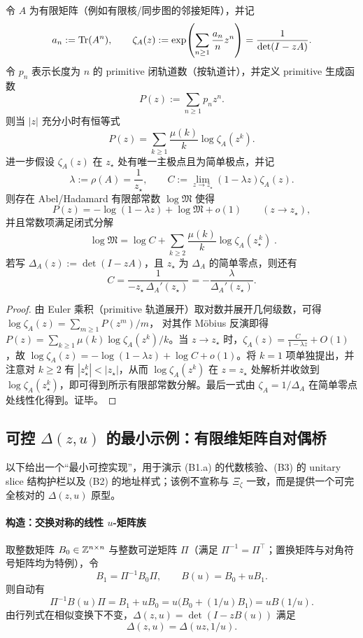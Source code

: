 \begin{theorem}\label{thm:abel-mertens-universal-bridge}
令 $A$ 为有限矩阵（例如有限核/同步图的邻接矩阵），并记
$$
a_n:=\mathrm{Tr}(A^n),\qquad
\zeta_A(z):=\exp\!\left(\sum_{n\ge 1}\frac{a_n}{n}z^n\right)=\frac{1}{\det(I-zA)}.
$$
令 $p_n$ 表示长度为 $n$ 的 primitive 闭轨道数（按轨道计），并定义 primitive 生成函数
$$
P(z):=\sum_{n\ge 1}p_n z^n.
$$
则当 $|z|$ 充分小时有恒等式
$$
P(z)=\sum_{k\ge 1}\frac{\mu(k)}{k}\log\zeta_A(z^k).
$$
进一步假设 $\zeta_A(z)$ 在 $z_\star$ 处有唯一主极点且为简单极点，并记
$$
\lambda:=\rho(A)=\frac{1}{z_\star},\qquad
C:=\lim_{z\to z_\star}(1-\lambda z)\zeta_A(z).
$$
则存在 Abel/Hadamard 有限部常数 $\log\mathfrak{M}$ 使得
$$
P(z)=-\log(1-\lambda z)+\log\mathfrak{M}+o(1)\qquad(z\to z_\star),
$$
并且常数项满足闭式分解
$$
\boxed{\;
\log\mathfrak{M}
=\log C+\sum_{k\ge 2}\frac{\mu(k)}{k}\log\zeta_A(z_\star^{\,k})\; }.
$$
若写 $\Delta_A(z):=\det(I-zA)$，且 $z_\star$ 为 $\Delta_A$ 的简单零点，则还有
$$
C=\frac{1}{-z_\star\,\Delta_A'(z_\star)}=-\frac{\lambda}{\Delta_A'(z_\star)}.
$$
\end{theorem}
\begin{proof}
由 Euler 乘积（primitive 轨道展开）取对数并展开几何级数，可得
$
\log\zeta_A(z)=\sum_{m\ge 1}P(z^m)/m
$，
对其作 Möbius 反演即得 $P(z)=\sum_{k\ge 1}\mu(k)\log\zeta_A(z^k)/k$。当 $z\to z_\star$ 时，$\zeta_A(z)=\frac{C}{1-\lambda z}+O(1)$，故 $\log\zeta_A(z)=-\log(1-\lambda z)+\log C+o(1)$。将 $k=1$ 项单独提出，并注意对 $k\ge 2$ 有 $|z_\star^k|<|z_\star|$，从而 $\log\zeta_A(z^k)$ 在 $z=z_\star$ 处解析并收敛到 $\log\zeta_A(z_\star^k)$，即可得到所示有限部常数分解。最后一式由 $\zeta_A=1/\Delta_A$ 在简单零点处线性化得到。证毕。
\end{proof}

\subsection{可控 \texorpdfstring{$\Delta(z,u)$}{Delta(z,u)} 的最小示例：有限维矩阵自对偶桥}
以下给出一个“最小可控实现”，用于演示 (B1.a) 的代数核验、(B3) 的 unitary slice 结构护栏以及 (B2) 的地址样式；该例不宣称与 $\Xi_\zeta$ 一致，而是提供一个可完全核对的 $\Delta(z,u)$ 原型。

\paragraph{构造：交换对称的线性 $u$-矩阵族}
取整数矩阵 $B_0\in\mathbb{Z}^{n\times n}$ 与整数可逆矩阵 $\Pi$（满足 $\Pi^{-1}=\Pi^\top$；置换矩阵与对角符号矩阵均为特例），令
$$
B_1=\Pi^{-1}B_0\Pi,\qquad B(u)=B_0+uB_1.
$$
则自动有
$$
\Pi^{-1}B(u)\Pi=B_1+uB_0=u\bigl(B_0+(1/u)B_1\bigr)=uB(1/u).
$$
由行列式在相似变换下不变，$\Delta(z,u)=\det(I-zB(u))$ 满足
$$
\Delta(z,u)=\Delta(uz,1/u).
$$

